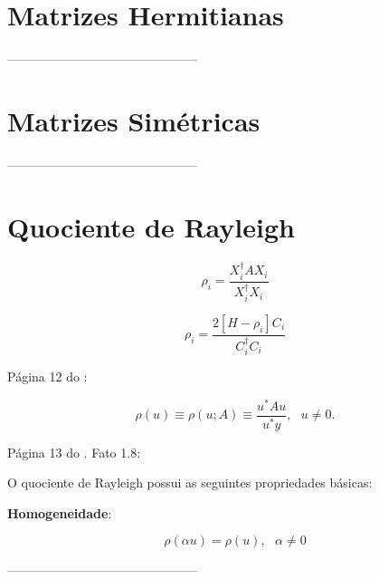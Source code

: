 \section{Matrizes Hermitianas}

	---------------------------------------------
	
\section{Matrizes Simétricas}
	
	---------------------------------------------
	
\section{Quociente de Rayleigh}\label{sec:quocienteRayleigh}
	
	
	\begin{equation}\label{eq:rho}
		\rho_i = \frac{X_i^\dagger A X_i}{X_i^\dagger X_i}
	\end{equation}
	
	
	\begin{equation}\label{eq:grad_rho}
		\rho_i = \frac{2[H - \rho_i]C_i}{C_i^\dagger C_i}
	\end{equation}
	
	Página 12 do \cite{Parlett1998}:
	
	\begin{equation}
		\rho(u) \equiv \rho(u; A) \equiv \frac{u^* A u}{u^*y}, \mbox{    } u \neq 0.
	\end{equation}
	
	
	Página 13 do \cite{Parlett1998}. Fato 1.8:
	
	O quociente de Rayleigh possui as seguintes propriedades básicas:
	
	\textbf{Homogeneidade}:
	
	\begin{equation}
		\rho(\alpha u) = \rho(u), \mbox{   } \alpha \neq 0
	\end{equation}
	
	
	---------------------------------------------